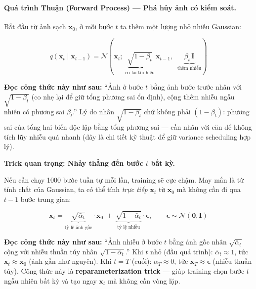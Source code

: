 \paragraph{Quá trình Thuận (Forward Process) --- Phá hủy ảnh có kiểm soát.}

Bắt đầu từ ảnh sạch $\mathbf{x}_0$, ở mỗi bước $t$ ta thêm một lượng nhỏ nhiễu Gaussian:

\begin{equation}
    q(\mathbf{x}_t \mid \mathbf{x}_{t-1}) = \mathcal{N}\!\left(\mathbf{x}_t;\; \underbrace{\sqrt{1-\beta_t}}_{\text{co lại tín hiệu}}\,\mathbf{x}_{t-1},\;\; \underbrace{\beta_t\,\mathbf{I}}_{\text{thêm nhiễu}}\right)
\end{equation}

\textbf{Đọc công thức này như sau:} ``Ảnh ở bước $t$ bằng ảnh bước trước nhân với $\sqrt{1-\beta_t}$ (co nhẹ lại để giữ tổng phương sai ổn định), cộng thêm nhiễu ngẫu nhiên có phương sai $\beta_t$.'' Lý do nhân $\sqrt{1-\beta_t}$ chứ không phải $(1-\beta_t)$: phương sai của tổng hai biến độc lập bằng tổng phương sai --- cần nhân với căn để không tích lũy nhiễu quá nhanh (đây là chi tiết kỹ thuật để giữ variance scheduling hợp lý).


\textbf{Trick quan trọng: Nhảy thẳng đến bước $t$ bất kỳ.}

Nếu cần chạy 1000 bước tuần tự mỗi lần, training sẽ cực chậm. May mắn là từ tính chất của Gaussian, ta có thể tính \textit{trực tiếp} $\mathbf{x}_t$ từ $\mathbf{x}_0$ mà không cần đi qua $t-1$ bước trung gian:

\begin{equation}
    \mathbf{x}_t = \underbrace{\sqrt{\bar{\alpha}_t}}_{\text{tỷ lệ ảnh gốc}} \cdot \mathbf{x}_0 \;+\; \underbrace{\sqrt{1 - \bar{\alpha}_t}}_{\text{tỷ lệ nhiễu}} \cdot \boldsymbol{\epsilon}, \qquad \boldsymbol{\epsilon} \sim \mathcal{N}(\mathbf{0}, \mathbf{I})
    \label{eq:ddpm_forward_direct}
\end{equation}

\textbf{Đọc công thức này như sau:} ``Ảnh nhiễu ở bước $t$ bằng ảnh gốc nhân $\sqrt{\bar{\alpha}_t}$ cộng với nhiễu thuần túy nhân $\sqrt{1 - \bar{\alpha}_t}$.'' Khi $t$ nhỏ (đầu quá trình): $\bar{\alpha}_t \approx 1$, tức $\mathbf{x}_t \approx \mathbf{x}_0$ (ảnh gần như nguyên). Khi $t = T$ (cuối): $\bar{\alpha}_T \approx 0$, tức $\mathbf{x}_T \approx \boldsymbol{\epsilon}$ (nhiễu thuần túy). Công thức này là \textbf{reparameterization trick} --- giúp training chọn bước $t$ ngẫu nhiên bất kỳ và tạo ngay $\mathbf{x}_t$ mà không cần vòng lặp.


